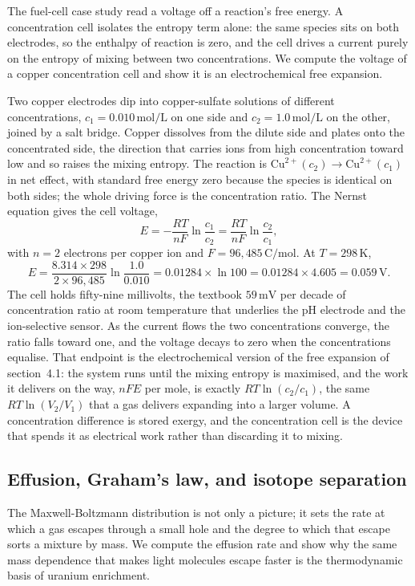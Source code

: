 The fuel-cell case study read a voltage off a reaction's free energy. A
concentration cell isolates the entropy term alone: the same species sits on
both electrodes, so the enthalpy of reaction is zero, and the cell drives a
current purely on the entropy of mixing between two concentrations. We compute
the voltage of a copper concentration cell and show it is an electrochemical
free expansion.

Two copper electrodes dip into copper-sulfate solutions of different
concentrations, $c_1 = 0.010\,\text{mol}/\text{L}$ on one side and $c_2 =
1.0\,\text{mol}/\text{L}$ on the other, joined by a salt bridge. Copper
dissolves from the dilute side and plates onto the concentrated side, the
direction that carries ions from high concentration toward low and so raises
the mixing entropy. The reaction is $\text{Cu}^{2+}(c_2) \to \text{Cu}^{2+}(c_1)$
in net effect, with standard free energy zero because the species is identical
on both sides; the whole driving force is the concentration ratio. The Nernst
equation gives the cell voltage,
\[
E = -\frac{RT}{nF}\ln\frac{c_1}{c_2}
= \frac{RT}{nF}\ln\frac{c_2}{c_1},
\]
with $n = 2$ electrons per copper ion and $F = 96{,}485\,\text{C}/\text{mol}$.
At $T = 298\,\si{\kelvin}$,
\[
E = \frac{8.314 \times 298}{2 \times 96{,}485}\ln\frac{1.0}{0.010}
= 0.01284 \times \ln 100
= 0.01284 \times 4.605
= 0.059\,\text{V}.
\]
The cell holds fifty-nine millivolts, the textbook $59\,\text{mV}$ per decade of
concentration ratio at room temperature that underlies the pH electrode and the
ion-selective sensor. As the current flows the two concentrations converge, the
ratio falls toward one, and the voltage decays to zero when the concentrations
equalise. That endpoint is the electrochemical version of the free expansion of
section~4.1: the system runs until the mixing entropy is maximised, and the
work it delivers on the way, $nFE$ per mole, is exactly $RT\ln(c_2/c_1)$, the
same $RT\ln(V_2/V_1)$ that a gas delivers expanding into a larger volume. A
concentration difference is stored exergy, and the concentration cell is the
device that spends it as electrical work rather than discarding it to mixing.

\subsection{Effusion, Graham's law, and isotope separation}

The Maxwell-Boltzmann distribution is not only a picture; it sets the rate at
which a gas escapes through a small hole and the degree to which that escape
sorts a mixture by mass. We compute the effusion rate and show why the same
mass dependence that makes light molecules escape faster is the thermodynamic
basis of uranium enrichment.

